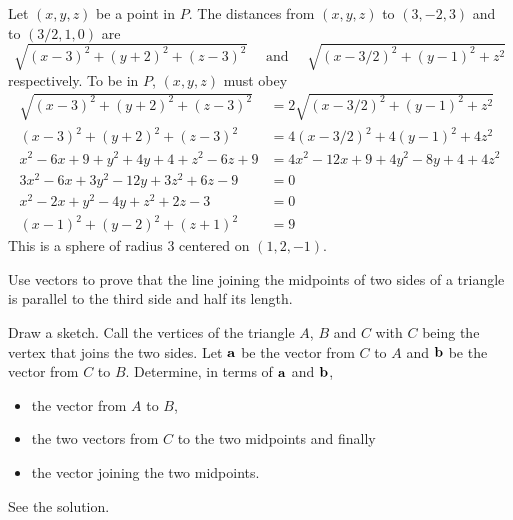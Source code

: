 \begin{solution}
Let $(x,y,z)$ be a point in $P$. The distances from
$(x,y,z)$ to $(3,-2,3)$ and to $(3/2,1,0)$ are 
\begin{equation*}
\sqrt{(x-3)^2+(y+2)^2+(z-3)^2}\quad\text{ and }\quad
\sqrt{(x-3/2)^2+(y-1)^2+z^2}
\end{equation*}
respectively. To be in $P$, $(x,y,z)$ must obey
\begin{align*}
\sqrt{(x-3)^2+(y+2)^2+(z-3)^2}&=2\sqrt{(x-3/2)^2+(y-1)^2+z^2} \\
(x-3)^2+(y+2)^2+(z-3)^2&=4(x-3/2)^2+4(y-1)^2+4z^2 \\
x^2-6x+9+y^2+4y+4+z^2-6z+9&=4x^2-12x+9+4y^2-8y+4+4z^2 \\
3x^2-6 x+3y^2-12y+3z^2+6z-9&=0 \\
x^2-2 x+y^2-4y+z^2+2z-3&=0 \\
(x-1)^2+(y-2)^2+(z+1)^2&=9
\end{align*}
This is a sphere of radius 3 centered on $(1,2,-1)$.
\end{solution}

\begin{question}
Use vectors to prove that the line joining the midpoints of two sides
of a triangle is parallel to the third side  and half its length.
\end{question}

\begin{hint}
Draw a sketch.
Call the vertices of the triangle $A$, $B$ and $C$ with $C$ being the
vertex that joins the two sides. Let $\mathbf{a}$ be the vector from $C$ to $A$ 
and $\mathbf{b}$ be the vector from $C$ to $B$. Determine, in terms of $\mathbf{a}$ and 
$\mathbf{b}$, 
\begin{itemize}\itemsep0pt \parskip0pt  %

\item 
the vector from $A$ to $B$, 
\item
the two vectors from $C$ to the two midpoints and finally 
\item
the vector joining the two midpoints. 
\end{itemize}
\end{hint}

\begin{answer}
See the solution.
\end{answer}

